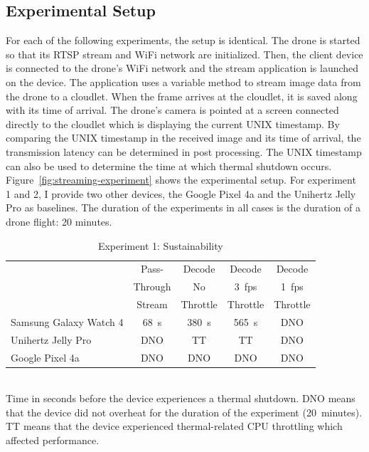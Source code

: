 \subsection{Experimental Setup}
\label{sec:streaming-experiment-setup}
For each of the following experiments, the setup is identical. The drone is started so that its RTSP stream and WiFi network are initialized. Then, the client device is connected to the drone’s WiFi network and the stream application is launched on the device. The application uses a variable method to stream image data from the drone to a cloudlet. When the frame arrives at the cloudlet, it is saved along with its time of arrival. The drone’s camera is pointed at a screen connected directly to the cloudlet which is displaying the current UNIX timestamp. By comparing the UNIX timestamp in the received image and its time of arrival, the transmission latency can be determined in post processing. The UNIX timestamp can also be used to determine the time at which thermal shutdown occurs. Figure~\ref{fig:streaming-experiment} shows the experimental setup. For experiment 1 and 2, I provide two other devices, the Google Pixel 4a and the Unihertz Jelly Pro as baselines. The duration of the experiments in all cases is the duration of a drone flight: 20 minutes.

\begin{table}
\centering
\begin{tabular}{|l|c|c|c|c|}
\hline
    & Pass- & Decode & Decode & Decode \\
    & Through & No & 3~fps & 1~fps \\
    & Stream & Throttle & Throttle & Throttle \\
\hline
Samsung Galaxy Watch 4 & \cellcolor{red!20}68~s & \cellcolor{red!20}380~s & \cellcolor{red!20}565~s & \cellcolor{green!20}DNO \\[0.1cm]
\hline
Unihertz Jelly Pro & \cellcolor{green!20}DNO & \cellcolor{red!20}TT & \cellcolor{red!20}TT & \cellcolor{green!20}DNO  \\[0.1cm]
\hline
Google Pixel 4a & \cellcolor{green!20}DNO & \cellcolor{green!20}DNO & \cellcolor{green!20}DNO & \cellcolor{green!20}DNO \\[0.1cm]
\hline
\end{tabular}
    \begin{captext}
    \\[0.1cm] \small Time in seconds before the device experiences a thermal shutdown. DNO means that the device did not overheat for the duration of the experiment (20~minutes). TT means that the device experienced thermal-related CPU throttling which affected performance.
    \end{captext}
\caption{Experiment 1: Sustainability}
\label{tab:time-before-overheating}
\end{table}


